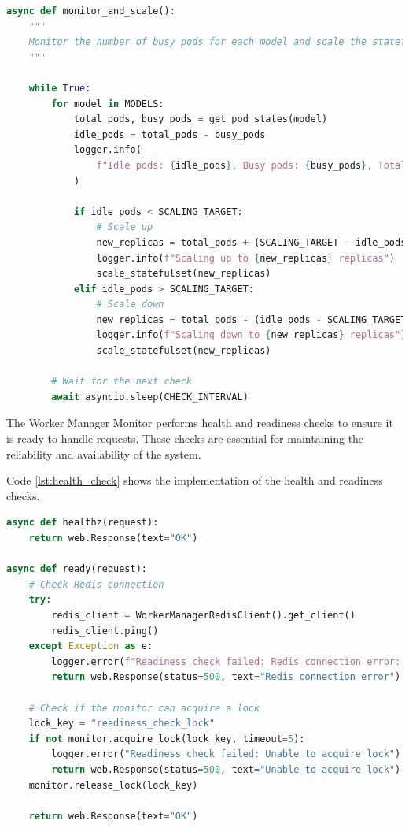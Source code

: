 \begin{lstlisting}[language=python, caption={Worker Scaling Policy}, label={lst:worker_scaling}]
async def monitor_and_scale():
    """
    Monitor the number of busy pods for each model and scale the statefulset up or down based on the number of idle pods.
    """

    while True:
        for model in MODELS:
            total_pods, busy_pods = get_pod_states(model)
            idle_pods = total_pods - busy_pods
            logger.info(
                f"Idle pods: {idle_pods}, Busy pods: {busy_pods}, Total pods: {total_pods}"
            )

            if idle_pods < SCALING_TARGET:
                # Scale up
                new_replicas = total_pods + (SCALING_TARGET - idle_pods)
                logger.info(f"Scaling up to {new_replicas} replicas")
                scale_statefulset(new_replicas)
            elif idle_pods > SCALING_TARGET:
                # Scale down
                new_replicas = total_pods - (idle_pods - SCALING_TARGET)
                logger.info(f"Scaling down to {new_replicas} replicas")
                scale_statefulset(new_replicas)

        # Wait for the next check
        await asyncio.sleep(CHECK_INTERVAL)
\end{lstlisting}

The Worker Manager Monitor performs health and readiness checks to ensure it is ready to handle requests. These checks are essential for maintaining the reliability and availability of the system. 

Code \ref{lst:health_check} shows the implementation of the health and readiness checks.


\begin{lstlisting}[language=python, caption={Worker Manager Monitor Health and Readiness Checks}, label={lst:health_check}]
async def healthz(request):
    return web.Response(text="OK")

async def ready(request):
    # Check Redis connection
    try:
        redis_client = WorkerManagerRedisClient().get_client()
        redis_client.ping()
    except Exception as e:
        logger.error(f"Readiness check failed: Redis connection error: {str(e)}")
        return web.Response(status=500, text="Redis connection error")

    # Check if the monitor can acquire a lock
    lock_key = "readiness_check_lock"
    if not monitor.acquire_lock(lock_key, timeout=5):
        logger.error("Readiness check failed: Unable to acquire lock")
        return web.Response(status=500, text="Unable to acquire lock")
    monitor.release_lock(lock_key)

    return web.Response(text="OK")
\end{lstlisting}

